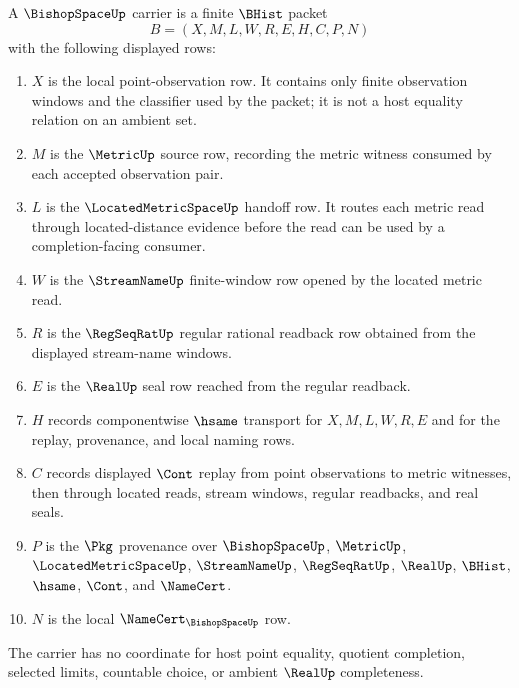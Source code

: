 \begin{definition}
\label{def:bishop-space-carrier}
A $\BishopSpaceUp$ carrier is a finite $\BHist$ packet
$$
B=(X,M,L,W,R,E,H,C,P,N)
$$
with the following displayed rows:
\begin{enumerate}
\item $X$ is the local point-observation row. It contains only finite observation windows and the classifier used by the packet; it is not a host equality relation on an ambient set.
\item $M$ is the $\MetricUp$ source row, recording the metric witness consumed by each accepted observation pair.
\item $L$ is the $\LocatedMetricSpaceUp$ handoff row. It routes each metric read through located-distance evidence before the read can be used by a completion-facing consumer.
\item $W$ is the $\StreamNameUp$ finite-window row opened by the located metric read.
\item $R$ is the $\RegSeqRatUp$ regular rational readback row obtained from the displayed stream-name windows.
\item $E$ is the $\RealUp$ seal row reached from the regular readback.
\item $H$ records componentwise $\hsame$ transport for $X,M,L,W,R,E$ and for the replay, provenance, and local naming rows.
\item $C$ records displayed $\Cont$ replay from point observations to metric witnesses, then through located reads, stream windows, regular readbacks, and real seals.
\item $P$ is the $\Pkg$ provenance over $\BishopSpaceUp$, $\MetricUp$, $\LocatedMetricSpaceUp$, $\StreamNameUp$, $\RegSeqRatUp$, $\RealUp$, $\BHist$, $\hsame$, $\Cont$, and $\NameCert$.
\item $N$ is the local $\NameCert_{\BishopSpaceUp}$ row.
\end{enumerate}
The carrier has no coordinate for host point equality, quotient completion, selected limits, countable choice, or ambient $\RealUp$ completeness.
\end{definition}

